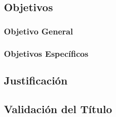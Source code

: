 \documentclass{article}
\begin{document}
\subsection{Objetivos}
    \subsubsection{Objetivo General}
    \subsubsection{Objetivos Específicos}

\subsection{Justificación}

\subsection{Validación del Título}
\end{document}
